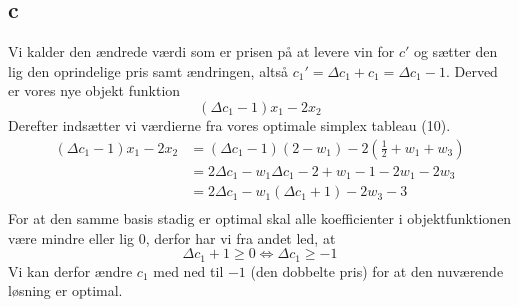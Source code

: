 \documentclass[a4paper]{article}
\begin{document}
\subsection*{c}
Vi kalder den ændrede værdi som er prisen på at levere vin for $c'$ og sætter den lig den oprindelige pris samt ændringen, altså $c_1'=\Delta c_1+c_1=\Delta c_1-1$. Derved er vores nye objekt funktion
$$(\Delta c_1-1)x_1-2x_2$$
Derefter indsætter vi værdierne fra vores optimale simplex tableau (10).
\begin{align*}
(\Delta c_1-1)x_1-2x_2&=(\Delta c_1-1)(2-w_1)-2(\frac{1}{2}+w_1+w_3) \\
&=2\Delta c_1-w_1\Delta c_1-2+w_1-1-2w_1-2w_3 \\
&=2\Delta c_1-w_1(\Delta c_1+1)-2w_3-3 \\
\end{align*}
For at den samme basis stadig er optimal skal alle koefficienter i objektfunktionen være mindre eller lig $0$, derfor har vi fra andet led, at
$$\Delta c_1 +1 \geq 0 \Leftrightarrow \Delta c_1 \geq -1$$
Vi kan derfor ændre $c_1$ med ned til $-1$ (den dobbelte pris) for at den nuværende løsning er optimal.
\end{document}
